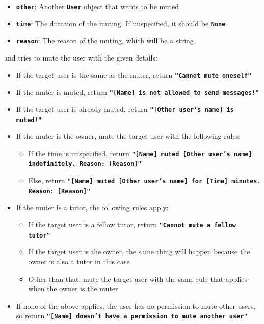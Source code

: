 \begin{itemize}
\begin{itemize}
        \item \texttt{\bfseries other}: Another \texttt{\bfseries User} object that wants to be muted
        \item \texttt{\bfseries time}: The duration of the muting. If unspecified, it should be \texttt{\bfseries None}
        \item \texttt{\bfseries reason}: The reason of the muting, which will be a string
    \end{itemize}
    and tries to mute the user with the given details:
    \begin{itemize}
        \item If the target user is the same as the muter, return \texttt{\bfseries "Cannot mute oneself"}
        \item If the muter is muted, return \texttt{\bfseries "[Name] is not allowed to send messages!"}
        \item If the target user is already muted, return \texttt{\bfseries "[Other user's name] is muted!"}
        \item If the muter is the owner, mute the target user with the following rules:
        \begin{itemize}
            \item If the time is unspecified, return 
            \texttt{\bfseries "[Name] muted [Other user's name] indefinitely. Reason: [Reason]"}
            \item Else, return
            \texttt{\bfseries "[Name] muted [Other user's name] for [Time] minutes. Reason: [Reason]"}
        \end{itemize}
        \item If the muter is a tutor, the following rules apply:
        \begin{itemize}
            \item If the target user is a fellow tutor, return \texttt{\bfseries "Cannot mute a fellow tutor"}
            \item If the target user is the owner, the same thing will happen because the owner is also a tutor in this case
            \item Other than that, mute the target user with the same rule that applies when the owner is the muter
        \end{itemize}
        \item If none of the above applies, the user has no permission to mute other users, so return 
        \texttt{\bfseries "[Name] doesn't have a permission to mute another user"}
    \end{itemize}

\end{itemize}
